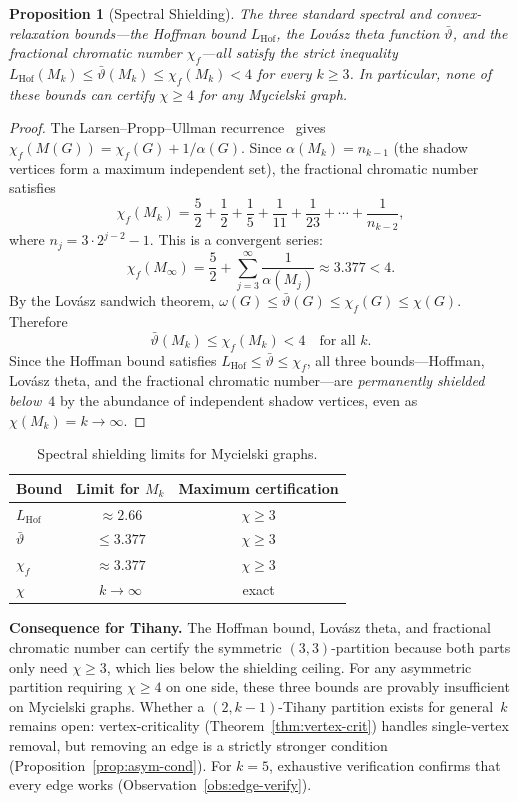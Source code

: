 \documentclass[11pt,a4paper]{amsart}
\theoremstyle{plain}
\newtheorem{proposition}[theorem]{Proposition}
\theoremstyle{definition}
\theoremstyle{remark}
\newcommand{\chr}{\chi}
\newcommand{\om}{\omega}
\newcommand{\LHof}{L_{\mathrm{Hof}}}
\begin{document}
\begin{proposition}[Spectral Shielding]\label{prop:shielding}
The three standard spectral and convex-relaxation bounds---the Hoffman bound
$\LHof$, the Lov\'asz theta function $\bar{\vartheta}$, and the fractional
chromatic number $\chr_f$---all satisfy the strict inequality
$\LHof(M_k) \leq \bar{\vartheta}(M_k) \leq \chr_f(M_k) < 4$ for every
$k \geq 3$.  In particular, none of these bounds can certify $\chr \geq 4$
for any Mycielski graph.
\end{proposition}

\begin{proof}
The Larsen--Propp--Ullman recurrence~\cite{larsen1995} gives
$\chr_f(M(G)) = \chr_f(G) + 1/\alpha(G)$.  Since $\alpha(M_k) = n_{k-1}$
(the shadow vertices form a maximum independent set), the fractional chromatic
number satisfies
\[
  \chr_f(M_k)
  = \frac{5}{2} + \frac{1}{2} + \frac{1}{5} + \frac{1}{11}
    + \frac{1}{23} + \cdots + \frac{1}{n_{k-2}},
\]
where $n_j = 3\cdot 2^{j-2} - 1$.  This is a convergent series:
\[
  \chr_f(M_\infty)
  = \frac{5}{2} + \sum_{j=3}^{\infty} \frac{1}{\alpha(M_j)}
  \approx 3.377 < 4.
\]
By the Lov\'asz sandwich theorem,
$\om(G) \leq \bar{\vartheta}(G) \leq \chr_f(G) \leq \chr(G)$.  Therefore
\[
  \bar{\vartheta}(M_k) \leq \chr_f(M_k) < 4 \quad\text{for all } k.
\]
Since the Hoffman bound satisfies
$\LHof \leq \bar{\vartheta} \leq \chr_f$, all three bounds---Hoffman,
Lov\'asz theta, and the fractional chromatic number---are \emph{permanently
shielded below~$4$} by the abundance of independent shadow vertices, even as
$\chr(M_k) = k \to \infty$.
\end{proof}

\begin{table}[ht]
\centering
\caption{Spectral shielding limits for Mycielski graphs.}
\label{tab:shielding}
\begin{tabular}{lcc}
\toprule
Bound & Limit for $M_k$ & Maximum certification \\
\midrule
$\LHof$            & $\approx 2.66$  & $\chr \geq 3$ \\
$\bar{\vartheta}$  & $\leq 3.377$    & $\chr \geq 3$ \\
$\chr_f$           & $\approx 3.377$ & $\chr \geq 3$ \\
$\chr$             & $k \to \infty$  & exact \\
\bottomrule
\end{tabular}
\end{table}

\noindent
\textbf{Consequence for Tihany.}
The Hoffman bound, Lov\'asz theta, and fractional chromatic number can certify
the symmetric $(3,3)$-partition because both parts only need $\chr \geq 3$,
which lies below the shielding ceiling.  For any asymmetric partition requiring
$\chr \geq 4$ on one side, these three bounds are provably insufficient on
Mycielski graphs.  Whether a $(2,k{-}1)$-Tihany partition exists for
general~$k$ remains open: vertex-criticality
(Theorem~\ref{thm:vertex-crit}) handles single-vertex removal, but removing an
edge is a strictly stronger condition
(Proposition~\ref{prop:asym-cond}).  For $k = 5$, exhaustive verification
confirms that every edge works (Observation~\ref{obs:edge-verify}).
\end{document}
